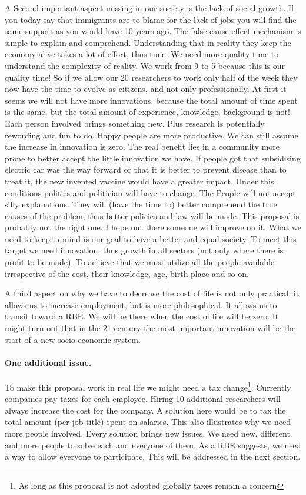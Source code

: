 \documentclass{article}
\begin{document}
A Second important aspect missing in our society is the lack of social growth.
If you today say that immigrants are to blame for the lack of jobs you will find the same support as you would have 10 years ago.
The false cause effect mechanism is simple to explain and comprehend.
Understanding that in reality they keep the economy alive takes a lot of effort, thus time.
We need more quality time to understand the complexity of reality.
We work from 9 to 5 because this is our quality time!
So if we allow our 20 researchers to work only half of the week they now have the time to evolve as citizens, and not only professionally.
At first it seems we will not have more innovations, because the total amount of time spent is the same, but the total amount of experience, knowledge, background is not!
Each person involved brings something new.
Plus research is potentially rewording and fun to do.
Happy people are more productive.
We can still assume the increase in innovation is zero.
The real benefit lies in a community more prone to better accept the little innovation we have.
If people got that subsidising electric car was the way forward or that it is better to prevent disease than to treat it, the new invented vaccine would have a greater impact.
Under this conditions politics and politician will have to change.
The People will not accept silly explanations.
They will (have the time to) better comprehend the true causes of the problem, thus better policies and law will be made.
This proposal is probably not the right one.
I hope out there someone will improve on it.
What we need to keep in mind is our goal to have a better and equal society.
To meet this target we need innovation, thus growth in all sectors (not only where there is profit to be made).
To achieve that we must utilize all the people available irrespective of the cost, their knowledge, age, birth place and so on.

A third aspect on why we have to decrease the cost of life is not only practical, it allows us to increase employment, but is more philosophical.
It allows us to transit toward a RBE.
We will be there when the cost of life will be zero.
It might turn out that in the 21 century the most important innovation will be the start of a new socio-economic system.

\paragraph{One additional issue.}
To make this proposal work in real life we might need a tax change\footnote{As long as this proposal is not adopted globally taxes remain a concern}.
Currently companies pay taxes for each employee.
Hiring 10 additional researchers will always increase the cost for the company.
A solution here would be to tax the total amount (per job title) spent on salaries.
This also illustrates why we need more people involved.
Every solution brings new issues.
We need new, different and more people to solve each and everyone of them.
As a RBE suggests, we need a way to allow everyone to participate.
This will be addressed in the next section.
\end{document}
